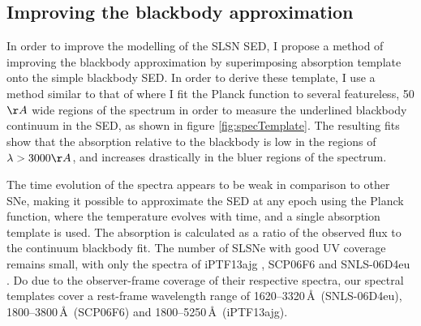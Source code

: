 \subsection{Improving the blackbody approximation} \label{sec:KCorrection}
In order to improve the modelling of the SLSN SED, I propose a method of improving the blackbody approximation by superimposing absorption template onto the simple blackbody SED. In order to derive these template, I use a method similar to that of  \citet{Vreeswijk2014} where I fit the Planck function to several featureless, 50$\AA$ wide regions of the spectrum in order to measure the underlined blackbody continuum in the SED, as shown in figure \ref{fig:specTemplate}. The resulting fits show that the absorption relative to the blackbody is low in the regions of $\lambda>3000\AA$, and increases drastically in the bluer regions of the spectrum.

The time evolution of the spectra appears to be weak in comparison to other SNe, making it possible to approximate the SED at any epoch using the Planck function, where the temperature evolves with time, and a single absorption template is used. The absorption is calculated as a ratio of the observed flux to the continuum blackbody fit. The number of SLSNe with good UV coverage remains small, with only the spectra of iPTF13ajg \citep{Vreeswijk2014}, SCP06F6 \citep{Barbary2009} and SNLS-06D4eu \citep{Howell2013}. Do due to the observer-frame coverage of their respective spectra, our spectral templates cover a rest-frame wavelength range of 1620--3320\,\AA\ (SNLS-06D4eu), 1800--3800\,\AA\ (SCP06F6) and 1800--5250\,\AA\ (iPTF13ajg).


